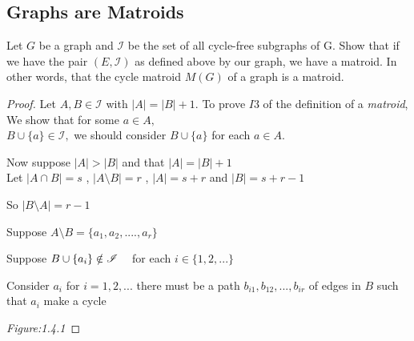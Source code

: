 \documentclass[../main.tex]{subfiles}
\begin{document}
\subsection{Graphs are Matroids} 
\begin{thm}
\noindent Let $G$ be a graph and $\mathcal{I}$ be the set of all cycle-free subgraphs of G.
Show that if we have the pair $(E,\mathcal{I})$ as defined above by our graph, we have a matroid. In other words, that the cycle matroid $M(G)$ of a graph is a matroid.
\end{thm} 
\begin{proof}
 Let $A,B \in \mathcal{I}$ with $|A|=|B|+1.$
 \noindent To prove $ I3 $ of the definition of a \textit{matroid}, We show that for some $a \in A ,$\\$ B \cup \{a\} \in \mathcal{I},$  we should consider $B \cup \{a\}$ for each $a \in A.$ 
 
 \noindent Now suppose $ |A|  >  |B| $ and that $|A|  =  |B| + 1$\\
 Let 
 $ |A \cap B| = s $ , $ |A \setminus B| = r$ ,
 $ |A| = s + r $ and $ |B| = s + r - 1$ 
 
\noindent So $ |B \setminus A| = r - 1$
 
 \noindent Suppose $ A \setminus B = \{ a_1, a_2, .... , a_r \} $ 
 
 \noindent Suppose $ B \cup \{ a_i \} \notin \mathcal{I} \hspace{3mm} $ for each $ i \in \{ 1,2,... \}$
 
 \noindent Consider $ a_i $ for $ i = 1, 2,... $ there must be a path $ b_{i1}, b_{12}, ... , b_{ir} $ of edges in $B$ such that $ a_i $ make a cycle
  
 \begin{minipage}{.2\textwidth}
\textit{Figure:1.4.1}
 \end{minipage}
\hspace{4cm} \begin{minipage}{.2\textwidth}
\end{minipage}
\end{proof}
\end{document}
